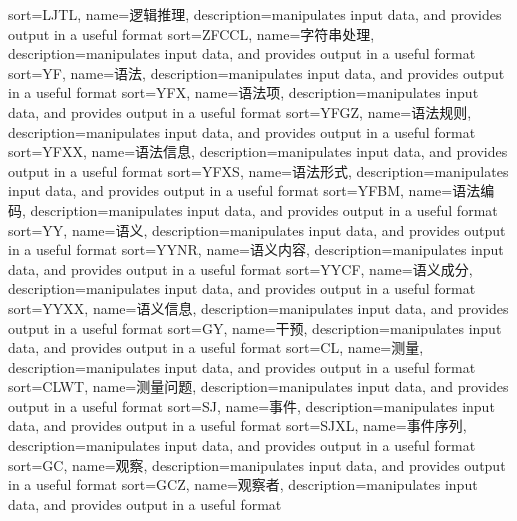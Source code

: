 {
  sort=LJTL,
  name=逻辑推理,
  description={manipulates input data, and provides output in a useful format}
}
{
  sort=ZFCCL,
  name=字符串处理,
  description={manipulates input data, and provides output in a useful format}
}
{
  sort=YF,
  name=语法,
  description={manipulates input data, and provides output in a useful format}
}
{
  sort=YFX,
  name=语法项,
  description={manipulates input data, and provides output in a useful format}
}
{
  sort=YFGZ,
  name=语法规则,
  description={manipulates input data, and provides output in a useful format}
}
{
  sort=YFXX,
  name=语法信息,
  description={manipulates input data, and provides output in a useful format}
}
{
  sort=YFXS,
  name=语法形式,
  description={manipulates input data, and provides output in a useful format}
}
{
  sort=YFBM,
  name=语法编码,
  description={manipulates input data, and provides output in a useful format}
}
{
  sort=YY,
  name=语义,
  description={manipulates input data, and provides output in a useful format}
}
{
  sort=YYNR,
  name=语义内容,
  description={manipulates input data, and provides output in a useful format}
}
{
  sort=YYCF,
  name=语义成分,
  description={manipulates input data, and provides output in a useful format}
}
{
  sort=YYXX,
  name=语义信息,
  description={manipulates input data, and provides output in a useful format}
}
{
  sort=GY,
  name=干预,
  description={manipulates input data, and provides output in a useful format}
}
{
  sort=CL,
  name=测量,
  description={manipulates input data, and provides output in a useful format}
}
{
  sort=CLWT,
  name=测量问题,
  description={manipulates input data, and provides output in a useful format}
}
{
  sort=SJ,
  name=事件,
  description={manipulates input data, and provides output in a useful format}
}
{
  sort=SJXL,
  name=事件序列,
  description={manipulates input data, and provides output in a useful format}
}
{
  sort=GC,
  name=观察,
  description={manipulates input data, and provides output in a useful format}
}
{
  sort=GCZ,
  name=观察者,
  description={manipulates input data, and provides output in a useful format}
}
